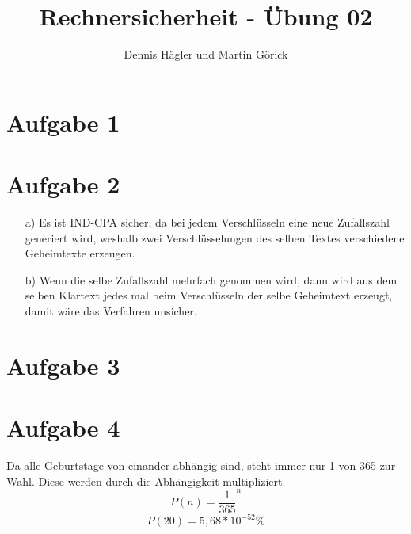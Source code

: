 \documentclass{scrartcl}
\title{Rechnersicherheit - Übung 02}
\author{Dennis Hägler und Martin Görick}
\begin{document}
\maketitle


\section{Aufgabe 1}

\section{Aufgabe 2}
\begin{itemize}
\item[a)] Es ist IND-CPA sicher, da bei jedem Verschlüsseln eine neue Zufallszahl generiert wird, weshalb zwei Verschlüsselungen des selben Textes verschiedene Geheimtexte erzeugen.
\item[b)] Wenn die selbe Zufallszahl mehrfach genommen wird, dann wird aus dem selben Klartext jedes mal beim Verschlüsseln der selbe Geheimtext erzeugt, damit wäre das Verfahren unsicher.
\end{itemize}

\section{Aufgabe 3}

\section{Aufgabe 4}
Da alle Geburtstage von einander abhängig sind, steht immer nur 1 von 365  zur Wahl. Diese werden durch die Abhängigkeit multipliziert.
$$ P(n) = \frac{1}{365}^{n}$$
$$ P(20) = 5,68 * 10^{-52} \% $$
\end{document}

